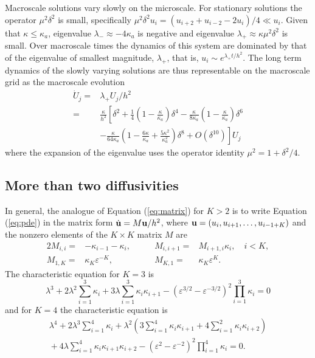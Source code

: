 \documentclass[12pt,a4paper]{article}
\begin{document}
Macroscale solutions vary slowly on the microscale. For stationary solutions the operator $\mu^2\delta^2$ is small, specifically $\mu^2\delta^2u_i=(u_{i+2}+u_{i-2}-2u_i)/4\ll u_i$. Given that $\kappa\leq \kappa_a$, eigenvalue $\lambda_-\approx -4\kappa_a$ is negative and eigenvalue $\lambda_+\approx \kappa\mu^2\delta^2$ is small. Over macroscale times the dynamics of this system are dominated by that of the eigenvalue of smallest magnitude, $\lambda_+$, that is, $u_i\sim e^{\lambda_+ t/h^2}$. 
The long term dynamics of the slowly varying solutions are thus representable on the macroscale grid as the macroscale evolution
\begin{align}
\dot{U}_j=&\lambda_+U_j/h^2\nonumber\\
=&\frac{\kappa}{h^2}\left[\delta^2+\frac{1}{4}\left(1-\frac{\kappa}{\kappa_a}\right)\delta^4-\frac{\kappa}{8\kappa_a}\left(1-\frac{\kappa}{\kappa_a}\right)\delta^6\right.\nonumber\\
&{}\left.-\frac{\kappa}{64\kappa_a} \left(1-\frac{6\kappa}{\kappa_a}+\frac{5\kappa^2}{\kappa^2_a}\right)\delta^8+O(\delta^{10})
\right]U_j\label{eq:g}
\end{align}
where the expansion of the eigenvalue uses the operator identity $\mu^2=1+\delta^2/4$. 

\subsection{More than two diffusivities}

In general, the analogue of Equation (\ref{eq:matrix}) for $K>2$ is to write Equation (\ref{eq:pde}) in the matrix form $\dot{{\bf u}}=M{\bf u}/h^2$, where ${\bf u}=(u_i,u_{i+1},\ldots,u_{i-1+K})$ and the nonzero elements of the $K\times K$ matrix $M$ are
\begin{alignat}2
M_{i,i}=&-\kappa_{i-1}-\kappa_i,\qquad  &M_{i,i+1}=&M_{i+1,i}\kappa_i,\quad i<K,\nonumber\\
M_{1,K}=&\kappa_K\varepsilon ^{-K},\qquad &M_{K,1}=&\kappa_K\varepsilon ^{K}.
\end{alignat}
The characteristic equation for $K=3$ is
\begin{equation}
\lambda^3+2\lambda^2\sum_{i=1}^3\kappa_i+3\lambda\sum_{i=1}^3\kappa_i\kappa_{i+1}-(\varepsilon ^{3/2}-\varepsilon ^{-3/2})^2\prod_{i=1}^3\kappa_i=0\label{eq:K3}
\end{equation}
and for $K=4$ the characteristic equation is
\begin{multline}
\lambda^4+2\lambda^3\sum_{i=1}^4\kappa_i+\lambda^2\left(3\sum_{i=1}^4\kappa_i\kappa_{i+1}+4\sum_{i=1}^2\kappa_i\kappa_{i+2}\right)\\
{}+4\lambda\sum_{i=1}^4\kappa_i\kappa_{i+1}\kappa_{i+2}-(\varepsilon ^{2}-\varepsilon ^{-2})^2\prod_{i=1}^4\kappa_i=0.
\label{eq:K4}
\end{multline}
\end{document}
